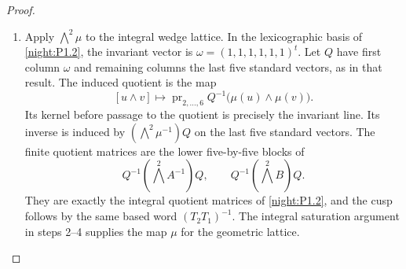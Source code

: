 \begin{proof}
\begin{enumerate}[label={$\langle1\rangle$\arabic*.}]
\item Apply $\bigwedge^2\mu$ to the integral wedge lattice. In the
lexicographic basis of \cref{night:P1.2}, the invariant vector is
$\omega=(1,1,1,1,1,1)^t$. Let $Q$ have first column $\omega$ and
remaining columns the last five standard vectors, as in that result.
The induced quotient is the map
\[
 [u\wedge v]\longmapsto
 \operatorname{pr}_{2,\ldots,6}
 Q^{-1}\bigl(\mu(u)\wedge\mu(v)\bigr).
\]
Its kernel before passage to the quotient is precisely the invariant
line. Its inverse is induced by $(\bigwedge^2\mu^{-1})Q$ on the last
five standard vectors. The finite quotient matrices are the lower
five-by-five blocks of
\[
 Q^{-1}(\bigwedge^2 A^{-1})Q,\qquad
 Q^{-1}(\bigwedge^2 B)Q.
\]
They are exactly the integral quotient matrices of
\cref{night:P1.2}, and the cusp follows by the same based word
$(T_2T_1)^{-1}$.
The integral saturation argument in steps 2--4 supplies the map $\mu$
for the geometric lattice.
\end{enumerate}
\end{proof}




